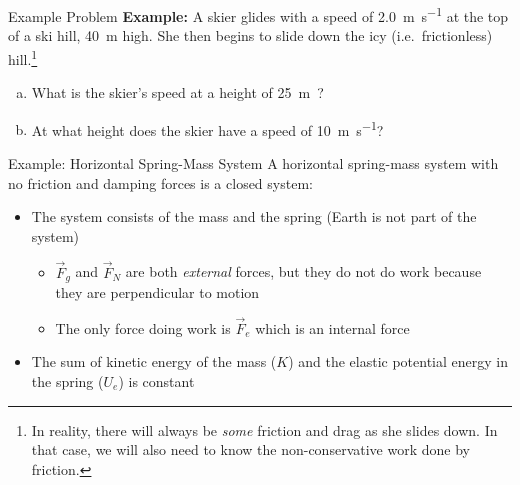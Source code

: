 \documentclass[12pt,compress,aspectratio=169]{beamer}
\begin{document}
\begin{frame}{Example Problem}
  \textbf{Example:} A skier glides with a speed of \SI{2.0}{\metre\per\second}
  at the top of a ski hill, \SI{40}{\metre} high. She then begins to slide down
  the icy (i.e.\ frictionless) hill.\footnote{In reality, there will always be
  \emph{some} friction and drag as she slides down. In that case, we will also
  need to know the non-conservative work done by friction.}
  \begin{enumerate}[(a)]
  \item What is the skier's speed at a height of \SI{25}\metre?
  \item At what height does the skier have a speed of
    \SI{10}{\metre\per\second}?
  \end{enumerate}
\end{frame}




\begin{frame}{Example: Horizontal Spring-Mass System}
  A horizontal spring-mass system with no friction and damping forces is a
  closed system:
  \begin{center}
    \vspace{-.05in}
  \end{center}
  \begin{itemize}
  \item\vspace{-.1in} The system consists of the mass and the spring (Earth is
    not part of the system)
    \begin{itemize}
    \item $\vec F_g$ and $\vec F_N$ are both \emph{external} forces, but they
      do not do work because they are perpendicular to motion
    \item The only force doing work is $\vec F_e$ which is an internal force
    \end{itemize}
  \item The sum of kinetic energy of the mass ($K$) and the elastic
    potential energy in the spring ($U_e$) is constant

  \end{itemize}
\end{frame}
\end{document}
